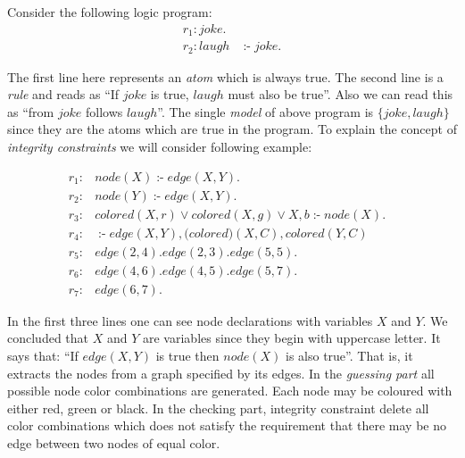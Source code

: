 \documentclass[14pt,a4paper, titlepage]{article}
\DeclareMathOperator{\leftimpl}{:-}
\begin{document}
\begin{exmp} 
Consider the following logic program:
\begin{align*}
r_1\colon\mathit{ joke }.& \\
r_2\colon\mathit{ laugh } & \leftimpl \mathit{ joke }.
\end{align*} 
\end{exmp}
The first line here represents an \emph{atom} which is 
always true. The second line is a \emph{rule} and reads as 
\enquote{If $\mathit{joke}$ is true, $\mathit{laugh}$ must 
also be true}. Also we can read this as \enquote{from 
$\mathit{joke}$ follows $\mathit{laugh}$}. The single 
\emph{model} of above program is $\{\mathit{joke}, 
\mathit{laugh}\}$ since they are the atoms which are true 
in the program. To explain the concept of \emph{integrity 
constraints} we will consider following example:
\begin{exmp}
\begin{align*}
r_1\colon & \mathit{node}(X) \leftimpl \mathit{edge}(X, Y). 
&\\
r_2\colon & \mathit{node}(Y) \leftimpl \mathit{edge}(X, Y). 
& \\
r_3\colon & \mathit{colored}(X, r) \vee \mathit{colored}(X, 
g) \vee \mathit{X, b} \leftimpl \mathit{node}(X). & \\
r_4\colon & \leftimpl \mathit{edge}(X, Y), \mathit(colored)
(X, C), \mathit{colored}(Y, C) & \\
r_5\colon & \mathit{edge}(2, 4). \mathit{edge}(2, 3). 
\mathit{edge}(5, 5). & \\
r_6\colon & \mathit{edge}(4, 6). \mathit{edge}(4, 5). 
\mathit{edge}(5, 7). & \\
r_7\colon & \mathit{edge}(6, 7). &
\end{align*} 
\end{exmp}
In the first three lines one can see node declarations with 
variables $X$ and $Y$. We concluded that $X$ and $Y$ are 
variables since they begin with uppercase letter. It says 
that: \enquote{If $\mathit{edge}(X,Y)$ is true then 
$\mathit{node(X)}$ is also true}. That is, it extracts the 
nodes from a graph specified by its edges. In the 
\emph{guessing part} all possible node color combinations 
are generated. Each node may be coloured with either red, 
green or black. In the checking part, integrity constraint 
delete all color combinations which does not satisfy the 
requirement that there may be no edge between two nodes of 
equal color. 
\end{document}
